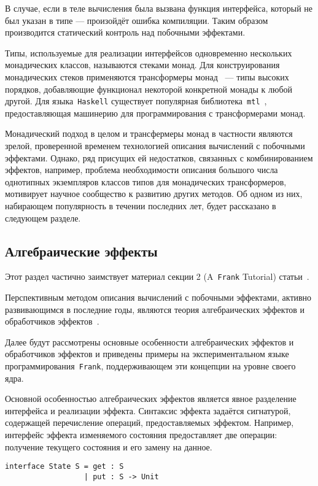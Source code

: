 \documentclass [a4paper] {article}
\begin{document}
В случае, если в теле вычисления была вызвана функция интерфейса, 
который не был указан в типе --- произойдёт ошибка компиляции. 
Таким образом производится статический контроль над побочными 
эффектами.

Типы, используемые для реализации интерфейсов одновременно нескольких
монадических классов, называются стеками монад. Для конструирования
монадических стеков применяются трансформеры монад~\cite{monadTransformers}
--- типы высоких порядков,
добавляющие функционал некоторой конкретной монады к любой другой. Для
языка~\texttt{Haskell} существует популярная библиотека~\texttt{mtl}~\cite{mtlHackage},
предоставляющая машинерию для программирования с трансформерами монад.

Монадический подход в целом и трансфермеры монад в частности являются зрелой,
проверенной временем технологией описания вычислений с побочными эффектами.
Однако, ряд присущих ей недостатков, связанных с комбинированием эффектов,
например, проблема необходимости описания большого числа однотипных
экземпляров классов типов для монадических трансформеров, мотивирует научное  
сообщество к развитию других методов. Об одном из них, набирающем популярность
в течении последних лет, будет рассказано в следующем разделе. 

\subsection{Алгебраические эффекты}

Этот раздел частично заимствует материал секции 2 (A~\texttt{Frank} Tutorial)
статьи~\cite{Frank}.

Перспективным методом описания вычислений с побочными эффектами, активно
развивающимся в последние годы, являются теория алгебраических
эффектов и обработчиков эффектов~\cite{AlgEffects}.

Далее будут рассмотрены основные особенности алгебраических эффектов и
обработчиков эффектов и приведены примеры на экспериментальном языке
программирования~\texttt{Frank}, поддерживающем эти концепции на уровне своего ядра.

Основной особенностью алгебраических эффектов является явное разделение
интерфейса и реализации эффекта. Синтаксис эффекта задаётся сигнатурой,
содержащей перечисление операций, предоставляемых эффектом. Например, интерфейс 
эффекта изменяемого состояния предоставляет две операции: получение текущего
состояния и его замену на данное.

\begin{verbatim}
interface State S = get : S
                  | put : S -> Unit
\end{verbatim}
\end{document}
